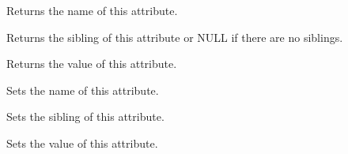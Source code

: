Returns the name of this attribute.

\label{wxxmlattributegetnext}


Returns the sibling of this attribute or NULL if there are no siblings.

\label{wxxmlattributegetvalue}


Returns the value of this attribute.

\label{wxxmlattributesetname}


Sets the name of this attribute.

\label{wxxmlattributesetnext}


Sets the sibling of this attribute.

\label{wxxmlattributesetvalue}


Sets the value of this attribute.

